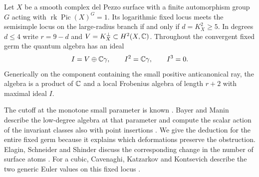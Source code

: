 \begin{proposition}\label{prop:cutoff}
Let $X$ be a smooth complex del Pezzo surface with a finite automorphism group $G$ acting with $\operatorname{rk}\operatorname{Pic}(X)^G=1$. Its logarithmic fixed locus meets the semisimple locus on the large-radius branch if and only if $d=K_X^2\ge5$. In degrees $d\le4$ write $r=9-d$ and $V=K_X^\perp\subset H^2(X,\mathbb C)$. Throughout the convergent fixed germ the quantum algebra has an ideal
\[
                 I=V\oplus\mathbb C\gamma,\qquad I^2=\mathbb C\gamma,\qquad I^3=0 .
\]
Generically on the component containing the small positive anticanonical ray, the algebra is a product of $\mathbb C$ and a local Frobenius algebra of length $r+2$ with maximal ideal $I$.
\end{proposition}

The cutoff at the monotone small parameter is known \cite[\S1.2]{Kaw}. Bayer and Manin describe the low-degree algebra at that parameter and compute the scalar action of the invariant classes also with point insertions \cite[Corollary~3.3.2 and Proposition~3.5.5]{BM}. We give the deduction for the entire fixed germ because it explains which deformations preserve the obstruction. Elagin, Schneider and Shinder discuss the corresponding change in the number of surface atoms \cite[Remark~1.6]{ESS}. For a cubic, Cavenaghi, Katzarkov and Kontsevich describe the two generic Euler values on this fixed locus \cite[Example~2.14]{CKK}.

